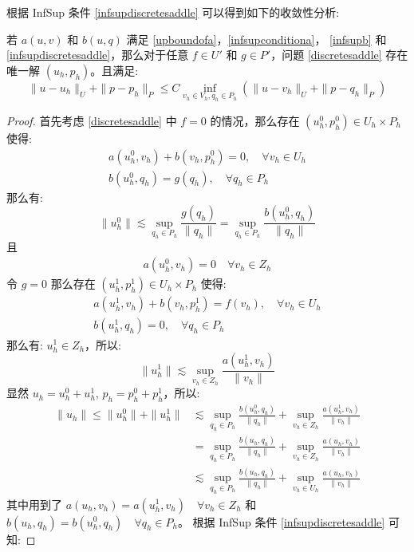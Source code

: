\documentclass[lang=cn,a4paper,newtx]{elegantpaper}
\begin{document}
根据 InfSup 条件 \eqref{infsupdiscretesaddle} 可以得到如下的收敛性分析:
\begin{theorem}
    若 $a(u, v)$ 和 $b(u, q)$ 满足 \eqref{upboundofa}，\eqref{infsupconditiona}，
    \eqref{infsupb} 和 \eqref{infsupdiscretesaddle}，那么对于任意 $f\in U'$ 和
    $g\in P'$，问题 \eqref{discretesaddle} 存在唯一解 $(u_h, p_h)$。且满足:
    $$
    \|u - u_h\|_U + \|p - p_h\|_P \leq C \inf_{v_h\in V_h, q_h\in P_h}(\|u - v_h\|_U + \|p - q_h\|_P) 
    $$
\end{theorem}
\begin{proof}
    首先考虑 \eqref{discretesaddle} 中 $f = 0$ 的情况，那么存在 $(u_h^0, p_h^0)
    \in U_h\times P_h$ 使得:
    $$
    \begin{aligned}
    a(u_h^0, v_h) + b(v_h, p_h^0) = 0, \quad \forall v_h \in U_h\\
    b(u_h^0, q_h) = g(q_h), \quad \forall q_h \in P_h
    \end{aligned}
    $$
    那么有:
    $$
    \|u_h^0\| \lesssim \sup_{q_h\in P_h}\frac{g(q_h)}{\|q_h\|}
    = \sup_{q_h\in P_h}\frac{b(u_h^0, q_h)}{\|q_h\|}
    $$
    且 
    \begin{align}
    \label{uh0orth}
    a(u_h^0, v_h) = 0 \quad \forall v_h \in Z_h 
    \end{align}
    令 $g = 0$ 那么存在 $(u_h^1, p_h^1) \in U_h\times P_h$ 使得: 
    $$
    \begin{aligned}
    a(u_h^1, v_h) + b(v_h, p_h^1) = f(v_h), \quad \forall v_h \in U_h\\
    b(u_h^1, q_h) = 0, \quad \forall q_h \in P_h
    \end{aligned}
    $$
    那么有: $u_h^1 \in Z_h$，所以:
    $$
    \|u_h^1\| \lesssim \sup_{v_h\in Z_h}\frac{a(u_h^1, v_h)}{\|v_h\|}
    $$
    显然 $u_h = u_h^0 + u_h^1$, $p_h = p_h^0 + p_h^1$，所以:
    $$
    \begin{aligned}
    \|u_h\| \leq \|u_h^0\| + \|u_h^1\| & \lesssim \sup_{q_h\in P_h}\frac{b(u_h^0, q_h)}{\|q_h\|}
    + \sup_{v_h\in Z_h}\frac{a(u_h^1, v_h)}{\|v_h\|}\\
    & = \sup_{q_h\in P_h}\frac{b(u_h, q_h)}{\|q_h\|}
    + \sup_{v_h\in Z_h}\frac{a(u_h, v_h)}{\|v_h\|}\\
    & \lesssim \sup_{q_h\in P_h}\frac{b(u_h, q_h)}{\|q_h\|}
    + \sup_{v_h\in U_h}\frac{a(u_h, v_h)}{\|v_h\|}
    \end{aligned}
    $$
    其中用到了 $a(u_h, v_h) = a(u_h^1, v_h)\quad \forall v_h \in Z_h$ 和
    $b(u_h, q_h) = b(u_h^0, q_h) \quad \forall q_h \in P_h$。
    根据 InfSup 条件 \eqref{infsupdiscretesaddle} 可知:

\end{proof}
\end{document}
